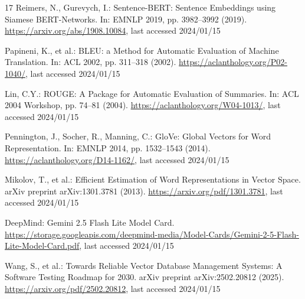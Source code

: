 \documentclass[runningheads]{llncs}
\begin{document}
\begin{thebibliography}{17}
Reimers, N., Gurevych, I.: Sentence-BERT: Sentence Embeddings using Siamese BERT-Networks. In: EMNLP 2019, pp. 3982--3992 (2019). \url{https://arxiv.org/abs/1908.10084}, last accessed 2024/01/15

Papineni, K., et al.: BLEU: a Method for Automatic Evaluation of Machine Translation. In: ACL 2002, pp. 311--318 (2002). \url{https://aclanthology.org/P02-1040/}, last accessed 2024/01/15

Lin, C.Y.: ROUGE: A Package for Automatic Evaluation of Summaries. In: ACL 2004 Workshop, pp. 74--81 (2004). \url{https://aclanthology.org/W04-1013/}, last accessed 2024/01/15

Pennington, J., Socher, R., Manning, C.: GloVe: Global Vectors for Word Representation. In: EMNLP 2014, pp. 1532--1543 (2014). \url{https://aclanthology.org/D14-1162/}, last accessed 2024/01/15

Mikolov, T., et al.: Efficient Estimation of Word Representations in Vector Space. arXiv preprint arXiv:1301.3781 (2013). \url{https://arxiv.org/pdf/1301.3781}, last accessed 2024/01/15

DeepMind: Gemini 2.5 Flash Lite Model Card. \url{https://storage.googleapis.com/deepmind-media/Model-Cards/Gemini-2-5-Flash-Lite-Model-Card.pdf}, last accessed 2024/01/15

Wang, S., et al.: Towards Reliable Vector Database Management Systems: A Software Testing Roadmap for 2030. arXiv preprint arXiv:2502.20812 (2025). \url{https://arxiv.org/pdf/2502.20812}, last accessed 2024/01/15

\end{thebibliography}
\end{document}
